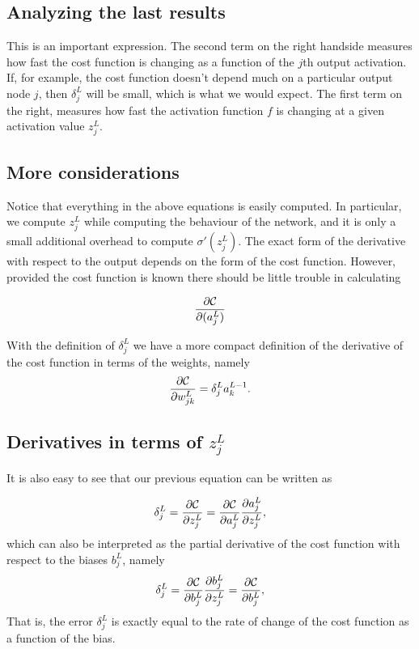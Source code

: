 \documentclass[%
oneside,                 %
final,                   %
10pt]{article}
\begin{document}
\subsection{Analyzing the last results}

This is an important expression. The second term on the right handside
measures how fast the cost function is changing as a function of the $j$th
output activation.  If, for example, the cost function doesn't depend
much on a particular output node $j$, then $\delta_j^L$ will be small,
which is what we would expect. The first term on the right, measures
how fast the activation function $f$ is changing at a given activation
value $z_j^L$.

\subsection{More considerations}

Notice that everything in the above equations is easily computed.  In
particular, we compute $z_j^L$ while computing the behaviour of the
network, and it is only a small additional overhead to compute
$\sigma'(z^L_j)$.  The exact form of the derivative with respect to the
output depends on the form of the cost function.
However, provided the cost function is known there should be little
trouble in calculating

\[
\frac{\partial {\cal C}}{\partial (a_j^L)}
\]

With the definition of $\delta_j^L$ we have a more compact definition of the derivative of the cost function in terms of the weights, namely
\[
\frac{\partial{\cal C}}{\partial w_{jk}^L}  =  \delta_j^La_k^{L-1}.
\]

\subsection{Derivatives in terms of $z_j^L$}

It is also easy to see that our previous equation can be written as

\[
\delta_j^L =\frac{\partial {\cal C}}{\partial z_j^L}= \frac{\partial {\cal C}}{\partial a_j^L}\frac{\partial a_j^L}{\partial z_j^L},
\]
which can also be interpreted as the partial derivative of the cost function with respect to the biases $b_j^L$, namely
\[
\delta_j^L = \frac{\partial {\cal C}}{\partial b_j^L}\frac{\partial b_j^L}{\partial z_j^L}=\frac{\partial {\cal C}}{\partial b_j^L},
\]
That is, the error $\delta_j^L$ is exactly equal to the rate of change of the cost function as a function of the bias. 
\end{document}
